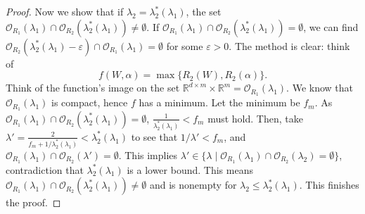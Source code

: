 \documentclass{article}
\begin{document}
\begin{proof}
Now we show that if $\lambda_2 = \lambda_2^*(\lambda_1)$, the set $\mathcal{O}_{R_1}(\lambda_1) \cap \mathcal{O}_{R_2}(\lambda_2^*(\lambda_1)) \neq \emptyset$. If $\mathcal{O}_{R_1}(\lambda_1) \cap \mathcal{O}_{R_2}(\lambda_2^*(\lambda_1)) = \emptyset$, we can find $\mathcal{O}_{R_2}(\lambda_2^*(\lambda_1) - \varepsilon) \cap \mathcal{O}_{R_1}(\lambda_1) = \emptyset$ for some $\varepsilon > 0$. The method is clear: think of 
\[f(W, \alpha) = \max \{ R_2(W), R_2(\alpha) \}.
\] 
Think of the function's image on the set $\mathbb{R}^{d \times m} \times \mathbb{R}^m = \mathcal{O}_{R_1}(\lambda_1)$. We know that $\mathcal{O}_{R_1}(\lambda_1)$ is compact, hence $f$ has a minimum. Let the minimum be $f_m$. As $\mathcal{O}_{R_1}(\lambda_1) \cap \mathcal{O}_{R_2}(\lambda_2^*(\lambda_1)) = \emptyset$, $\frac{1}{\lambda_2^*(\lambda_1)} < f_m$ must hold. Then, take $\lambda' = \frac{2}{f_m + 1/\lambda_2^*(\lambda_1)} < \lambda_2^*(\lambda_1)$ to see that $1/\lambda' < f_m$, and $\mathcal{O}_{R_1}(\lambda_1) \cap \mathcal{O}_{R_2}(\lambda') = \emptyset.$ This implies $\lambda' \in \{\lambda \mid \mathcal{O}_{R_1}(\lambda_1) \cap \mathcal{O}_{R_2}(\lambda_2) = \emptyset\}$, contradiction that $\lambda_2^*(\lambda_1)$ is a lower bound.
This means $\mathcal{O}_{R_1}(\lambda_1) \cap \mathcal{O}_{R_2}(\lambda_2^*(\lambda_1)) \neq \emptyset$ and is nonempty for $\lambda_2 \leq \lambda_2^*(\lambda_1)$. This finishes the proof.
\end{proof}
\end{document}
